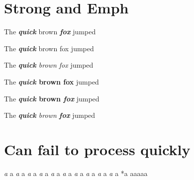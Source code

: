 
\def\mytitle{Edge Cases}


\part{Strong and Emph}
\label{strongandemph}

The \textbf{\emph{quick}} brown \textbf{\emph{fox}} jumped

The \textbf{\emph{quick}} brown fox jumped

The \emph{\textbf{quick} brown fox} jumped

The \textbf{\emph{quick} brown fox} jumped

The \textbf{\emph{quick} brown \emph{fox}} jumped

The \emph{\textbf{quick} brown \textbf{fox}} jumped

\part{Can fail to process quickly}
\label{canfailtoprocessquickly}

\emph{a
}a
\emph{a
}a
\emph{a
}a
\emph{a
}a
\emph{a
}a
\emph{a
}a
\emph{a
}a
\emph{a
}a
\emph{a
}a
\emph{a
}a
*a
aaaaa





